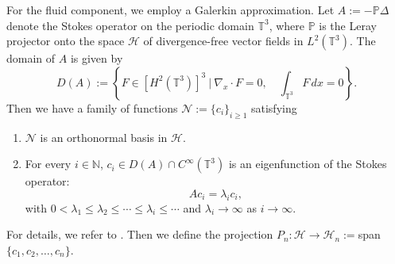 \documentclass[10pt,reqno]{amsart}
\numberwithin{equation}{section}
\newcommand{\T}{\mathbb T}
\newcommand{\lt}{\left}
\newcommand{\rt}{\right}
\newcommand{\intt}{\int_{\T^3}}
\begin{document}
For the fluid component, we employ a Galerkin approximation. Let $A := -\mathbb{P} \Delta$ denote the Stokes operator on the periodic domain $\T^3$, where $\mathbb{P}$ is the Leray projector onto the space $\mathcal{H}$ of divergence-free vector fields in $L^2(\T^3)$. The domain of $A$ is given by 
\[
D(A) := \lt\{ F \in [H^2(\T^3)]^3 \ \bigg| \ \nabla_x \cdot F = 0, \quad \intt F\,dx = 0\rt\}. 
\]
 Then we have a family of functions $ \mathcal{N}:= \{c_i\}_{i \ge 1}$ satisfying
\begin{enumerate}
\item
$\mathcal{N}$ is an orthonormal basis in $\mathcal{H}$.

\item
For every $i \in \mathbb{N}$, $c_i\in D(A)\cap C^\infty(\T^3)$ is an eigenfunction of the Stokes operator:
\[
Ac_i = \lambda_i c_i,
\]
with $0<\lambda_1 \le \lambda_2 \le \cdots \le \lambda_i \le \cdots$ and $\lambda_i \to \infty$ as $i \to \infty$. 
\end{enumerate}
For details, we refer to \cite[Theorem 2.24]{RRS}. Then we define the projection $P_n : \mathcal{H} \to \mathcal{H}_n :=$span$\{c_1, c_2, \dots, c_n\}$.
\end{document}
